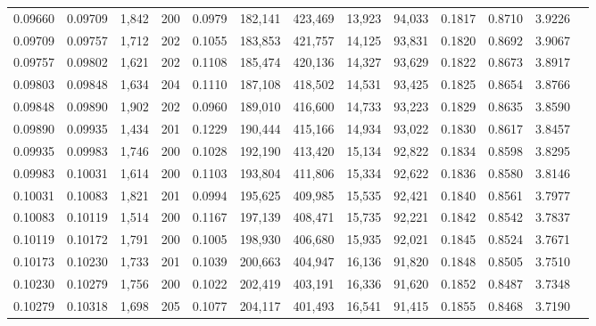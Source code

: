 \begin{tabular}{rrrrrrrrrrrrr}
0.09660 & 0.09709 & 1,842 & 200 &                                     0.0979 & 182,141 & 423,469 &  13,923 &  94,033 & 0.1817 & 0.8710 & 3.9226 \\
0.09709 & 0.09757 & 1,712 & 202 &                                     0.1055 & 183,853 & 421,757 &  14,125 &  93,831 & 0.1820 & 0.8692 & 3.9067 \\
0.09757 & 0.09802 & 1,621 & 202 &                                     0.1108 & 185,474 & 420,136 &  14,327 &  93,629 & 0.1822 & 0.8673 & 3.8917 \\
0.09803 & 0.09848 & 1,634 & 204 &                                     0.1110 & 187,108 & 418,502 &  14,531 &  93,425 & 0.1825 & 0.8654 & 3.8766 \\
0.09848 & 0.09890 & 1,902 & 202 &                                     0.0960 & 189,010 & 416,600 &  14,733 &  93,223 & 0.1829 & 0.8635 & 3.8590 \\
0.09890 & 0.09935 & 1,434 & 201 &                                     0.1229 & 190,444 & 415,166 &  14,934 &  93,022 & 0.1830 & 0.8617 & 3.8457 \\
0.09935 & 0.09983 & 1,746 & 200 &                                     0.1028 & 192,190 & 413,420 &  15,134 &  92,822 & 0.1834 & 0.8598 & 3.8295 \\
0.09983 & 0.10031 & 1,614 & 200 &                                     0.1103 & 193,804 & 411,806 &  15,334 &  92,622 & 0.1836 & 0.8580 & 3.8146 \\
0.10031 & 0.10083 & 1,821 & 201 &                                     0.0994 & 195,625 & 409,985 &  15,535 &  92,421 & 0.1840 & 0.8561 & 3.7977 \\
0.10083 & 0.10119 & 1,514 & 200 &                                     0.1167 & 197,139 & 408,471 &  15,735 &  92,221 & 0.1842 & 0.8542 & 3.7837 \\
0.10119 & 0.10172 & 1,791 & 200 &                                     0.1005 & 198,930 & 406,680 &  15,935 &  92,021 & 0.1845 & 0.8524 & 3.7671 \\
0.10173 & 0.10230 & 1,733 & 201 &                                     0.1039 & 200,663 & 404,947 &  16,136 &  91,820 & 0.1848 & 0.8505 & 3.7510 \\
0.10230 & 0.10279 & 1,756 & 200 &                                     0.1022 & 202,419 & 403,191 &  16,336 &  91,620 & 0.1852 & 0.8487 & 3.7348 \\
0.10279 & 0.10318 & 1,698 & 205 &                                     0.1077 & 204,117 & 401,493 &  16,541 &  91,415 & 0.1855 & 0.8468 & 3.7190 \\

\end{tabular}
